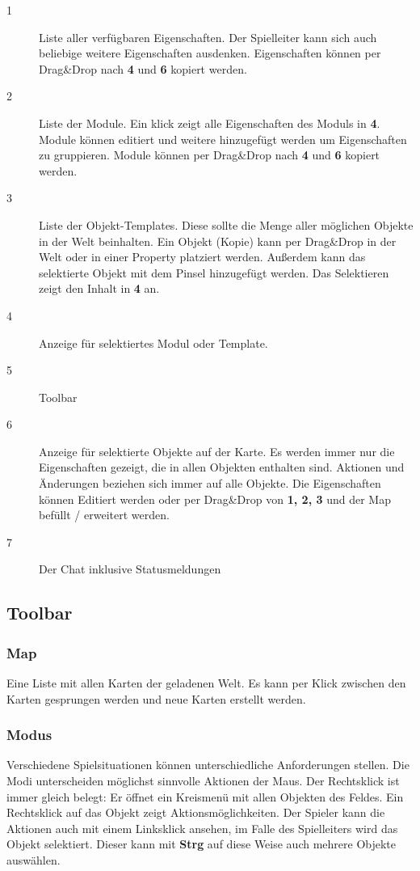 \documentclass[german,10pt,a4paper,twocolumn,colorscheme=darkblue]{orarticle}
\begin{document}
		\begin{description}
			\item[1] Liste aller verfügbaren Eigenschaften. Der Spielleiter kann sich auch beliebige weitere Eigenschaften ausdenken. Eigenschaften können per Drag\&Drop nach \textbf{4} und \textbf{6} kopiert werden.
			\item[2] Liste der Module. Ein klick zeigt alle Eigenschaften des Moduls in \textbf{4}. Module können editiert und weitere hinzugefügt werden um Eigenschaften zu gruppieren. Module können per Drag\&Drop nach \textbf{4} und \textbf{6} kopiert werden.
			\item[3] Liste der Objekt-Templates. Diese sollte die Menge aller möglichen Objekte in der Welt beinhalten. Ein Objekt (Kopie) kann per Drag\&Drop in der Welt oder in einer Property platziert werden. Außerdem kann das selektierte Objekt mit dem Pinsel hinzugefügt werden. Das Selektieren zeigt den Inhalt in \textbf{4} an.
			\item[4] Anzeige für selektiertes Modul oder Template.
			\item[5] Toolbar
			\item[6] Anzeige für selektierte Objekte auf der Karte. Es werden immer nur die Eigenschaften gezeigt, die in allen Objekten enthalten sind. Aktionen und Änderungen beziehen sich immer auf alle Objekte. Die Eigenschaften können Editiert werden oder per Drag\&Drop von \textbf{1, 2, 3} und der Map befüllt / erweitert werden.
			\item[7] Der Chat inklusive Statusmeldungen
		\end{description}
		
		\subsection{Toolbar}
		\vspace{-12pt}\subsubsection*{Map}
			Eine Liste mit allen Karten der geladenen Welt. Es kann per Klick zwischen den Karten gesprungen werden und neue Karten erstellt werden.
		\subsubsection*{Modus}
			Verschiedene Spielsituationen können unterschiedliche Anforderungen stellen. Die Modi unterscheiden möglichst sinnvolle Aktionen der Maus. Der Rechtsklick ist immer gleich belegt: Er öffnet ein Kreismenü mit allen Objekten des Feldes. Ein Rechtsklick auf das Objekt zeigt Aktionsmöglichkeiten. Der Spieler kann die Aktionen auch mit einem Linksklick ansehen, im Falle des Spielleiters wird das Objekt selektiert. Dieser kann mit \textbf{Strg} auf diese Weise auch mehrere Objekte auswählen.
			
\end{document}
